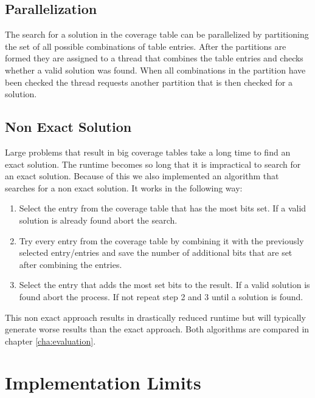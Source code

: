 \subsection{Parallelization}

The search for a solution in the coverage table can be parallelized by partitioning the set of all possible combinations of table entries. After the partitions are formed they are assigned to a thread that combines the table entries and checks whether a valid solution was found. When all combinations in the partition have been checked the thread requests another partition that is then checked for a solution.

\subsection{Non Exact Solution}

Large problems that result in big coverage tables take a long time to find an exact solution. The runtime becomes so long that it is impractical to search for an exact solution. Because of this we also implemented an algorithm that searches for a non exact solution. It works in the following way:
\begin{enumerate}
\item Select the entry from the coverage table that has the most bits set. If a valid solution is already found abort the search.
\item Try every entry from the coverage table by combining it with the previously selected entry/entries and save the number of additional bits that are set after combining the entries.
\item Select the entry that adds the most set bits to the result. If a valid solution is found abort the process. If not repeat step 2 and 3 until a solution is found.
\end{enumerate}

This non exact approach results in drastically reduced runtime but will typically generate worse results than the exact approach. Both algorithms are compared in chapter \ref{cha:evaluation}.

\section{Implementation Limits}

